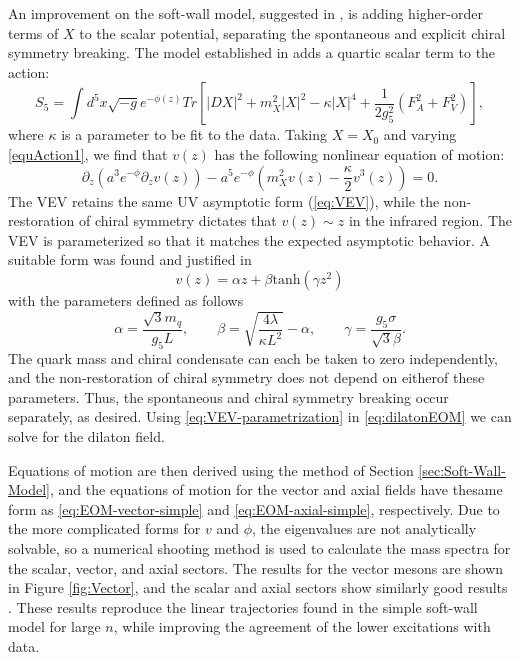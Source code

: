 An improvement on the soft-wall model, suggested in \cite{karch-katz-son-adsqcd}, is adding higher-order terms of $X$ to the scalar potential, separating the spontaneous and explicit chiral symmetry breaking. 
The model established in \cite{gherghetta-kelley} adds a quartic scalar term to the action:
\begin{equation}
S_{5}=\int d^{5}x\sqrt{-g}e^{-\phi(z)}Tr\left[|DX|^{2}+m_{X}^{2}|X|^{2}-\kappa|X|^{4}+\frac{1}{2g_{5}^{2}}(F_{A}^{2}+F_{V}^{2})\right],\label{equAction1}
\end{equation}
where $\kappa$ is a parameter to be fit to the data.
 Taking $X=X_{0}$ and varying \eqref{equAction1}, we find that $v(z)$ has the following nonlinear equation of motion:
\begin{equation}
\partial_{z}(a^{3}e^{-\phi}\partial_{z}v(z))-a^{5}e^{-\phi}\left(m_{X}^{2}v(z)-\frac{\kappa}{2}v^{3}(z)\right)=0.\label{eq:dilatonEOM}
\end{equation}
The VEV retains the same UV asymptotic form (\ref{eq:VEV}), while the non-restoration of chiral symmetry dictates that $v(z)\sim z$ in the infrared region. 
The VEV is parameterized so that it matches the expected asymptotic behavior. 
A suitable form was found and justified in \cite{gherghetta-kelley}
\begin{equation}
v(z)=\alpha z+\beta\text{tanh}(\gamma z^{2})\label{eq:VEV-parametrization}
\end{equation}
with the parameters defined as follows
\[
\alpha=\frac{\sqrt{3}m_{q}}{g_{5}L},\qquad\beta=\sqrt{\frac{4\lambda}{\kappa L^{2}}}-\alpha,\qquad\gamma=\frac{g_{5}\sigma}{\sqrt{3}\beta}.
\]
 The quark mass and chiral condensate can each be taken to zero independently, and the non-restoration of chiral symmetry does not depend on eitherof these parameters. 
 Thus, the spontaneous and chiral symmetry breaking occur separately, as desired. 
Using \eqref{eq:VEV-parametrization} in \eqref{eq:dilatonEOM} we can solve for the dilaton field.

Equations of motion are then derived using the method of Section \ref{sec:Soft-Wall-Model}, and the equations of motion for the vector and axial fields have thesame form as \ref{eq:EOM-vector-simple} and \eqref{eq:EOM-axial-simple}, respectively. 
Due to the more complicated forms for $v$ and $\phi$, the eigenvalues are not analytically solvable, so a numerical shooting method is used to calculate the mass spectra for the scalar, vector,
and axial sectors. 
The results for the vector mesons are shown in Figure \ref{fig:Vector}, and the scalar and axial sectors show similarly good results \cite{gherghetta-kelley}. 
These results reproduce the linear trajectories found in the simple soft-wall model \cite{karch-katz-son-adsqcd} for large $n$, while improving the agreement of the lower excitations with data.

